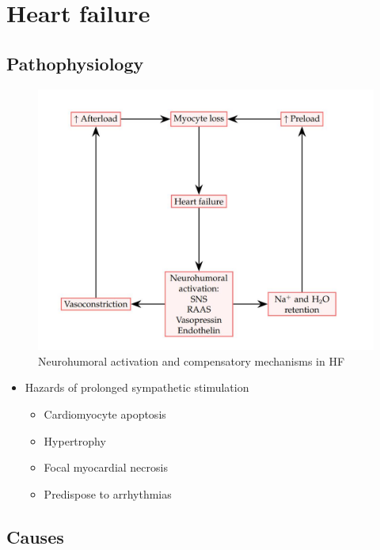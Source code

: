 \documentclass[
  12pt,
]{memoir}
\providecommand{\tightlist}{%
  \setlength{\itemsep}{0pt}\setlength{\parskip}{0pt}}
\begin{document}
\hypertarget{heart-failure}{%
\section{Heart failure}\label{heart-failure}}

\hypertarget{pathophysiology}{%
\subsection{Pathophysiology}\label{pathophysiology}}

\begin{figure}[h!]
    \centering
    \includegraphics[width=.9\textwidth]{../assets/med/hf-patho.jpg}
    \vspace{3mm}
    \caption{Neurohumoral activation and compensatory mechanisms in HF}
    \label{fig:hf-neuro}
\end{figure}

\begin{itemize}
\tightlist
\item
  Hazards of prolonged sympathetic stimulation

  \begin{itemize}
  \tightlist
  \item
    Cardiomyocyte apoptosis
  \item
    Hypertrophy
  \item
    Focal myocardial necrosis
  \item
    Predispose to arrhythmias
  \end{itemize}
\end{itemize}

\hypertarget{causes-1}{%
\subsection{Causes}\label{causes-1}}
\end{document}

